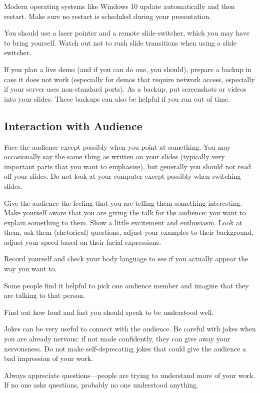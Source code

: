\documentclass[12pt]{article}
\begin{document}
Modern operating systems like Windows 10 update automatically and then restart.
Make sure no restart is scheduled during your presentation.
\medskip

You should use a laser pointer and a remote slide-switcher, which you may have to bring yourself.
Watch out not to rush slide transitions when using a slide switcher.
\medskip

If you plan a live demo (and if you can do one, you should), prepare a backup in case it does not work (especially for demos that require network access, especially if your server uses non-standard ports).
As a backup, put screenshots or videos into your slides.
These backups can also be helpful if you run out of time.

\subsection{Interaction with Audience}

Face the audience except possibly when you point at something.
You may occasionally say the same thing as written on your slides (typically very important parts that you want to emphasize), but generally you should not read off your slides.
Do not look at your computer except possibly when switching slides.
\medskip

Give the audience the feeling that you are telling them something interesting.
Make yourself aware that you are giving the talk for the audience: you want to explain something to them.
Show a little excitement and enthusiasm.
Look at them, ask them (rhetorical) questions, adjust your examples to their background, adjust your speed based on their facial expressions.
\medskip

Record yourself and check your body language to see if you actually appear the way you want to.
\medskip

Some people find it helpful to pick one audience member and imagine that they are talking to that person.
\medskip

Find out how loud and fast you should speak to be understood well.
\medskip

Jokes can be very useful to connect with the audience.
Be careful with jokes when you are already nervous: if not made confidently, they can give away your nervousness.
Do not make self-deprecating jokes that could give the audience a bad impression of your work.
\medskip

Always appreciate questions---people are trying to understand more of your work.
If no one asks questions, probably no one understood anything.
\end{document}

